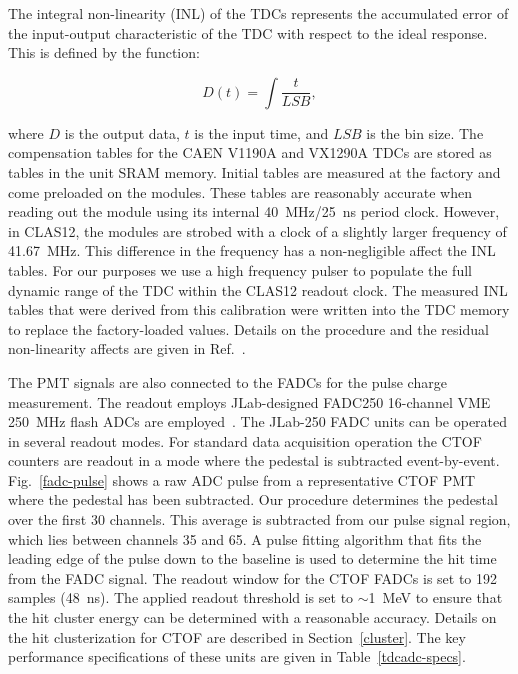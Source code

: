 \documentclass{elsart}
\begin{document}
The integral non-linearity (INL) of the TDCs represents the accumulated error of the input-output
characteristic of the TDC with respect to the ideal response. This is defined by the function:

\begin{equation}
D(t) = \int \frac{t}{LSB},
\end{equation}

\noindent
where $D$ is the output data, $t$ is the input time, and $LSB$ is the bin size. The compensation tables
for the CAEN V1190A and VX1290A TDCs are stored as tables in the unit SRAM memory. Initial tables
are measured at the factory and come preloaded on the modules. These tables are reasonably accurate
when reading out the module using its internal 40~MHz/25~ns period clock. However, in CLAS12, the
modules are strobed with a clock of a slightly larger frequency of 41.67~MHz. This difference in the
frequency has a non-negligible affect the INL tables. For our purposes we use a high frequency pulser to
populate the full dynamic range of the TDC within the CLAS12 readout clock. The measured INL tables that
were derived from this calibration were written into the TDC memory to replace the factory-loaded values.
Details on the procedure and the residual non-linearity affects are given in Ref.~\cite{inl-tables}.

The PMT signals are also connected to the FADCs for the pulse charge measurement. The readout
employs JLab-designed FADC250 16-channel VME 250~MHz flash ADCs are employed~\cite{fadc-manual}.
The JLab-250 FADC units can be operated in several readout modes. For standard data acquisition operation
the CTOF counters are readout in a mode where the pedestal is subtracted event-by-event.
Fig.~\ref{fadc-pulse} shows a raw ADC pulse from a representative CTOF PMT where the pedestal has 
been subtracted. Our procedure determines the pedestal over the first 30 channels. This average is
subtracted from our pulse signal region, which lies between channels 35 and 65. A pulse fitting algorithm
that fits the leading edge of the pulse down to the baseline is used to determine the hit time from the
FADC signal. The readout window for the CTOF FADCs is set to 192 samples (48~ns). The applied readout
threshold is set to $\sim$1~MeV to ensure that the hit cluster energy can be determined with a reasonable
accuracy. Details on the hit clusterization for CTOF are described in Section~\ref{cluster}. The key
performance specifications of these units are given in Table~\ref{tdcadc-specs}.
\end{document}
